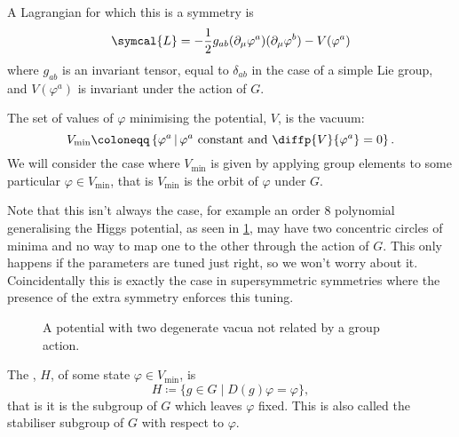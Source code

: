 \documentclass[fleqn]{NotesClass}
\newcommand{\lagrangianDensity}{\symcal{L}}
\begin{document}
    A Lagrangian for which this is a symmetry is
    \begin{equation}
        \lagrangianDensity = -\frac{1}{2}g_{ab}(\partial_\mu \varphi^a)(\partial_\mu \varphi^b) - V(\varphi^a)
    \end{equation}
    where \(g_{ab}\) is an invariant tensor, equal to \(\delta_{ab}\) in the case of a simple Lie group, and \(V(\varphi^a)\) is invariant under the action of \(G\).
    
    The set of values of \(\varphi\) minimising the potential, \(V\), is the vacuum:
    \begin{equation}
        V_{\min} \coloneqq \left\{ \varphi^a \,\middle\vert\, \varphi^a \text{ constant and } \diffp{V}{\varphi^a} = 0 \right\}.
    \end{equation}
    We will consider the case where \(V_{\min}\) is given by applying group elements to some particular \(\varphi \in V_{\min}\), that is \(V_{\min}\) is the orbit of \(\varphi\) under \(G\).
    
    Note that this isn't always the case, for example an order 8 polynomial generalising the Higgs potential, as seen in \cref{fig:octic higgs}, may have two concentric circles of minima and no way to map one to the other through the action of \(G\).
    This only happens if the parameters are tuned just right, so we won't worry about it.
    Coincidentally this is exactly the case in supersymmetric symmetries where the presence of the extra symmetry enforces this tuning.
    
    \begin{figure}
        \caption{A potential with two degenerate vacua not related by a group action.}
        \label{fig:octic higgs}
    \end{figure}
    
    The , \(H\), of some state \(\varphi \in V_{\min}\), is
    \begin{equation}
        H \coloneqq \{g \in G \mid D(g)\varphi = \varphi\},
    \end{equation}
    that is it is the subgroup of \(G\) which leaves \(\varphi\) fixed.
    This is also called the stabiliser subgroup of \(G\) with respect to \(\varphi\).
    
\end{document}
